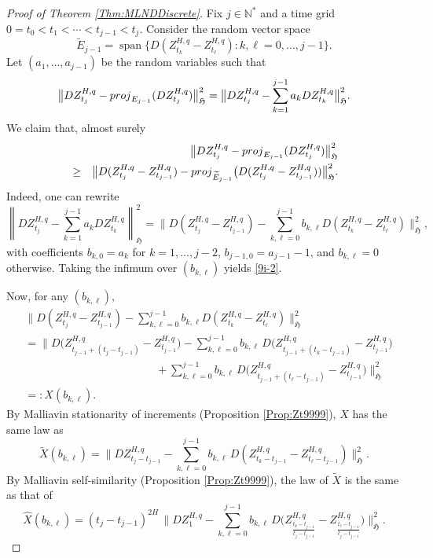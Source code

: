 \documentclass[10pt,a4paper]{amsart}
\newcommand\HHH{\mathfrak{H}}
\newcommand{\N}{\mathbb{N}}
\begin{document}
\begin{proof}[Proof of Theorem \ref{Thm:MLNDDiscrete}]
Fix $j\in \N^*$ and a time grid $0=t_0<t_1<\cdots<t_{j-1}<t_j$.  
Consider the random vector space
\[
\widetilde{E}_{j-1}=\operatorname{span}\big\{D(Z^{H,q}_{t_k}-Z^{H,q}_{t_\ell}) : k,\ell=0,\ldots,j-1\big\}.
\] 	
Let $(a_1,\ldots,a_{j-1})$ be the random variables such that 
\[
\big\| D Z^{H,q}_{t_j} - {\rm proj}_{E_{j-1}}(D Z^{H,q}_{t_j}) \big\|_{\HHH}^2
= \big\| D Z^{H,q}_{t_j} - \sum_{k=1}^{j-1} a_k D Z^{H,q}_{t_k} \big\|_{\HHH}^2.
\]
We claim that, almost surely
\begin{eqnarray}
&&\big\| DZ^{H,q}_{t_j} - {\rm proj}_{E_{j-1}}(DZ^{H,q}_{t_j}) \big\|_{\HHH}^2 \notag\\
&\ge& \big\| D(Z^{H,q}_{t_j}-Z^{H,q}_{t_{j-1}}) - {\rm proj}_{\widetilde{E}_{j-1}}\big(D(Z^{H,q}_{t_j}-Z^{H,q}_{t_{j-1}})) \big\|_{\HHH}^2.\label{9i-2}
\end{eqnarray}
Indeed, one can rewrite
\[
\left\| DZ^{H,q}_{t_j} - \sum_{k=1}^{j-1} a_k DZ^{H,q}_{t_k} \right\|_{\HHH}^2 
= \Big\| D(Z^{H,q}_{t_j}-Z^{H,q}_{t_{j-1}}) - \sum_{k,\ell=0}^{j-1} b_{k,\ell} D(Z^{H,q}_{t_k}-Z^{H,q}_{t_\ell}) \Big\|_{\HHH}^2,
\]
with coefficients $b_{k,0}=a_k$ for $k=1,\ldots,j-2$, $b_{j-1,0}=a_{j-1}-1$, and $b_{k,\ell}=0$ otherwise.  
Taking the infimum over $(b_{k,\ell})$ yields \eqref{9i-2}.  

Now, for any $(b_{k,\ell})$,
\begin{align*}
&\Big\| D(Z^{H,q}_{t_j}-Z^{H,q}_{t_{j-1}}) - \sum_{k,\ell=0}^{j-1} b_{k,\ell} D(Z^{H,q}_{t_k}-Z^{H,q}_{t_\ell}) \Big\|_{\HHH}^2 \\
&= \Big\| D\!\big(Z^{H,q}_{t_{j-1}+(t_j-t_{j-1})}-Z^{H,q}_{t_{j-1}}\big) 
     - \sum_{k,\ell=0}^{j-1} b_{k,\ell}\,D\!\big(Z^{H,q}_{t_{j-1}+(t_k-t_{j-1})}-Z^{H,q}_{t_{j-1}}\big) \\
&\hspace{5cm} + \sum_{k,\ell=0}^{j-1} b_{k,\ell}\,D\!\big(Z^{H,q}_{t_{j-1}+(t_\ell-t_{j-1})}-Z^{H,q}_{t_{j-1}}\big)\Big\|_{\HHH}^2\\
&=:X(b_{k,\ell}).
\end{align*}
By Malliavin stationarity of increments (Proposition \ref{Prop:Zt9999}), $X$ has the same law as
\[
\widetilde{X}(b_{k,\ell})=\Big\| DZ^{H,q}_{t_j-t_{j-1}} - \sum_{k,\ell=0}^{j-1} b_{k,\ell}\,D(Z^{H,q}_{t_k-t_{j-1}}-Z^{H,q}_{t_\ell-t_{j-1}})\Big\|_{\HHH}^2.
\]
By Malliavin self-similarity  (Proposition \ref{Prop:Zt9999}), the law of $\widetilde{X}$ is the same as that of
\[
\hat{X}(b_{k,\ell})=(t_j-t_{j-1})^{2H}\,\Big\| DZ^{H,q}_{1} - \sum_{k,\ell=0}^{j-1} b_{k,\ell}\,D\!\Big(Z^{H,q}_{\frac{t_k-t_{j-1}}{t_j-t_{j-1}}}-Z^{H,q}_{\frac{t_\ell-t_{j-1}}{t_j-t_{j-1}}}\Big)\Big\|_{\HHH}^2.
\]


\end{proof}
\end{document}
